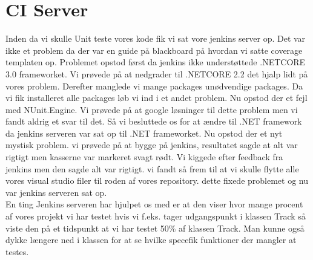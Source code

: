 \section{CI Server}
Inden da vi skulle Unit teste vores kode fik vi sat vore jenkins server op. Det var ikke et problem da der var en guide på blackboard på hvordan vi satte coverage templaten op. Problemet opstod først da jenkins ikke understøttede .NETCORE 3.0 frameworket. Vi prøvede på at nedgrader til .NETCORE 2.2 det hjalp lidt på vores problem. Derefter manglede vi mange packages unødvendige packages. Da vi fik installeret alle packages løb vi ind i et andet problem. Nu opstod der et fejl med NUnit.Engine. Vi prøvede på at google løsninger til dette problem men vi fandt aldrig et svar til det. Så vi besluttede os for at ændre til .NET framework da jenkins serveren var sat op til .NET frameworket. Nu opstod der et nyt mystisk problem. vi prøvede på at bygge på jenkins, resultatet sagde at alt var rigtigt men kasserne var markeret svagt rødt. Vi kiggede efter feedback fra jenkins men den sagde alt var rigtigt. vi fandt så frem til at vi skulle flytte alle vores visual studio filer til roden af vores repository. dette fixede problemet og nu var jenkins serveren sat op.\\
\medskip
En ting Jenkins serveren har hjulpet os med er at den viser hvor mange procent af vores projekt vi har testet hvis vi f.eks. tager udgangspunkt i klassen Track så viste den på et tidspunkt at vi har testet 50\% af klassen Track. Man kunne også dykke længere ned i klassen for at se hvilke specefik funktioner der mangler at testes. 


